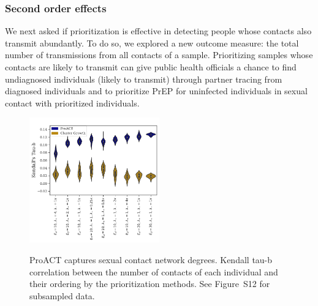 \documentclass[a4paper,11pt]{article}
\newcommand{\PLWH}{sample\xspace}
\begin{document}
\subsubsection{Second order effects}
We next asked if prioritization is effective in detecting people whose contacts also transmit abundantly. 
To do so, we explored a new outcome measure: the total number of transmissions from all contacts of a \PLWH. 
Prioritizing \PLWH{s} whose contacts are likely to transmit can give public health officials a chance to find undiagnosed individuals (likely to transmit) through partner tracing from diagnosed individuals and to  prioritize PrEP for uninfected individuals in sexual contact with prioritized individuals. 



\begin{figure}[!tp]
\centering
{\footnotesize
\includegraphics[width=0.5\textwidth]{figs/Fig4.pdf}%
\\
}
\caption{ProACT captures sexual contact network degrees.
 Kendall tau-b correlation between the number of contacts of each individual and their ordering by the prioritization methods.
 See Figure~S12 for subsampled data. 
 }
\label{fig:efficacy-conc}
\end{figure}
\end{document}
